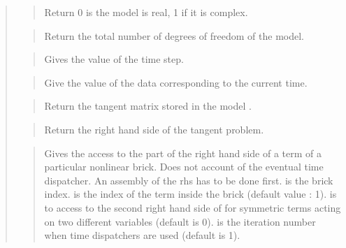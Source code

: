 \documentclass[a4paper,11pt,english]{sphinxmanual}
\begin{document}
\begin{quote}

\begin{quote}

Return 0 is the model is real, 1 if it is complex.
\end{quote}

\begin{quote}

Return the total number of degrees of freedom of the model.
\end{quote}

\begin{quote}

Gives the value of the time step.
\end{quote}

\begin{quote}

Give the value of the data  corresponding to the current time.
\end{quote}

\begin{quote}

Return the tangent matrix stored in the model .
\end{quote}

\begin{quote}

Return the right hand side of the tangent problem.
\end{quote}

\begin{quote}

Gives the access to the part of the right hand side of a term
of a particular nonlinear brick. Does not account of the eventual
time dispatcher. An assembly of the rhs has to be done first.
 is the brick index.  is the index of the
term inside the brick (default value : 1).
 is to access to the second right hand side of for symmetric
terms acting on two different variables (default is 0).
 is the iteration number when time dispatchers are
used (default is 1).
\end{quote}


\end{quote}
\end{document}
